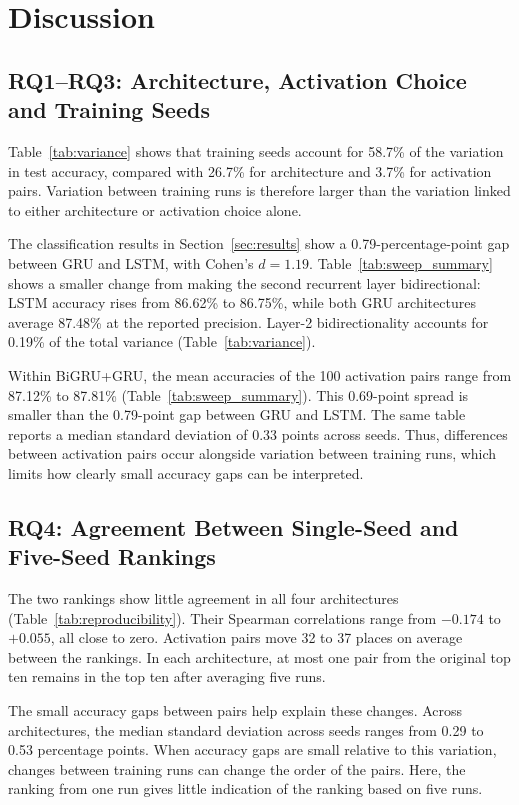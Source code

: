 \documentclass[conference,a4paper]{IEEEtran}
\begin{document}
\FloatBarrier
\section{Discussion}
\label{sec:discussion}

\subsection{RQ1--RQ3: Architecture, Activation Choice and Training Seeds}

Table~\ref{tab:variance} shows that training seeds account for
58.7\% of the variation in test accuracy, compared with 26.7\%
for architecture and 3.7\% for activation pairs. Variation
between training runs is therefore larger than the variation
linked to either architecture or activation choice alone.

The classification results in Section~\ref{sec:results} show
a 0.79-percentage-point gap between GRU and LSTM, with Cohen's
$d=1.19$. Table~\ref{tab:sweep_summary} shows a smaller change
from making the second recurrent layer bidirectional: LSTM
accuracy rises from 86.62\% to 86.75\%, while both GRU
architectures average 87.48\% at the reported precision.
Layer-2 bidirectionality accounts for 0.19\% of the total
variance (Table~\ref{tab:variance}).

Within BiGRU+GRU, the mean accuracies of the 100 activation
pairs range from 87.12\% to 87.81\%
(Table~\ref{tab:sweep_summary}). This 0.69-point spread is
smaller than the 0.79-point gap between GRU and LSTM.
The same table reports a median standard deviation of
0.33 points across seeds. Thus, differences between
activation pairs occur alongside variation between training
runs, which limits how clearly small accuracy gaps can
be interpreted.
\subsection{RQ4: Agreement Between Single-Seed and Five-Seed Rankings}

The two rankings show little agreement in all four architectures
(Table~\ref{tab:reproducibility}). Their Spearman correlations range
from $-0.174$ to $+0.055$, all close to zero. Activation pairs move
32 to 37 places on average between the rankings. In each
architecture, at most one pair from the original top ten remains
in the top ten after averaging five runs.

The small accuracy gaps between pairs help explain these changes.
Across architectures, the median standard deviation across seeds
ranges from 0.29 to 0.53 percentage points. When accuracy gaps are
small relative to this variation, changes between training runs
can change the order of the pairs. Here, the ranking from one run
gives little indication of the ranking based on five runs.
\end{document}

